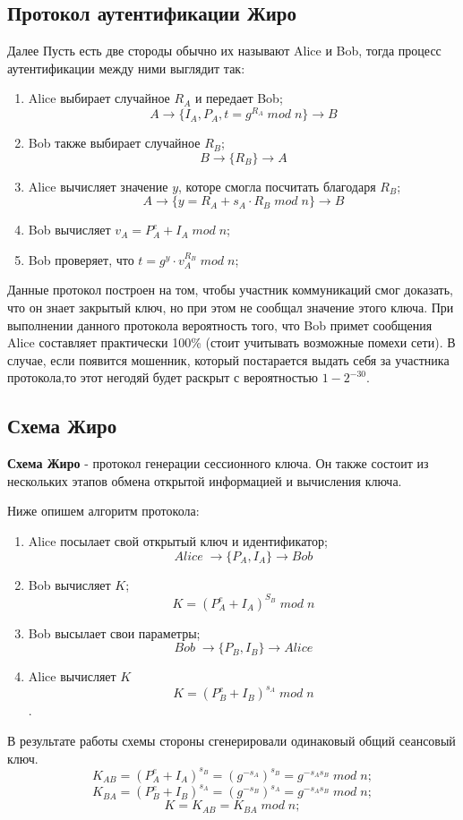 \documentclass[a4paper]{article}
\begin{document}
\subsection{Протокол аутентификации Жиро}
    Далее
    Пусть есть две стороды обычно их называют Alice и Bob, тогда процесс аутентификации между ними выглядит так:
    \begin{enumerate}
        \item Alice выбирает случайное $R_A$  и передает Bob; 
        $$A \rightarrow \{I_A, P_A, t = g^{R_A} \; mod \; n\} \rightarrow B $$
        \item Bob также выбирает случайное $R_B$;
        $$B \rightarrow \{R_B\} \rightarrow A $$
        \item Alice вычисляет значение $y$, которе смогла посчитать благодаря $R_B$; $$A \rightarrow \{y = R_A + s_A \cdot R_B \; mod \; n\} \rightarrow B $$
        \item Bob вычисляет $v_A = P_A^e + I_A \; mod \; n $;
        \item Bob проверяет, что $t = g^y\cdot v_A^{R_B} \; mod \; n$;
    \end{enumerate}

    Данные протокол построен на том, чтобы участник коммуникаций смог доказать, что он знает закрытый ключ, но при этом не сообщал значение этого ключа. При выполнении данного протокола вероятность того, что Bob примет сообщения Alice составляет практически 100\% (стоит учитывать возможные помехи сети).
    В случае, если появится мошенник, который постарается выдать себя за участника протокола,то этот негодяй будет раскрыт с вероятностью $1 - 2^{-30}$.

\subsection{Схема Жиро}
\textbf{Схема Жиро} - протокол генерации сессионного ключа. Он также состоит из нескольких этапов обмена открытой информацией и вычисления ключа.
\par Ниже опишем алгоритм протокола:
\begin{enumerate}
    \item Alice посылает свой открытый ключ и идентификатор; $$Alice \; \rightarrow \{ P_A, I_A\} \rightarrow Bob$$
    \item Bob вычисляет $K$; $$K = (P_A^e + I_A)^{S_B} \; mod \; n$$
    \item Bob высылает свои параметры; $$ Bob \; \rightarrow \{ P_B, I_B\} \rightarrow Alice $$
    \item Alice вычисляет $K$ $$K =(P_B^e + I_B)^{s_A} \; mod \; n$$.
\end{enumerate}
В результате работы схемы стороны сгенерировали одинаковый общий сеансовый ключ.
$$K_{AB} = (P_A^e + I_A)^{s_B} = (g^{-s_A})^{s_B} = g^{-s_As_B} \; mod \; n ;$$
$$K_{BA} = (P_B^e + I_B)^{s_A} = (g^{-s_B})^{s_A} = g^{-s_As_B} \; mod \; n ;$$
$$K = K_{AB} =K_{BA} \; mod \; n ;$$
\end{document}
